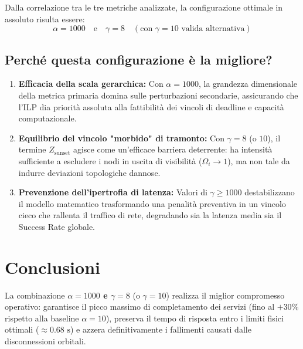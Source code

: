 \documentclass[11pt,a4paper]{article}
\begin{document}
Dalla correlazione tra le tre metriche analizzate, la configurazione ottimale in assoluto risulta essere:
\begin{equation}
    \boxed{\alpha = 1000 \quad \text{e} \quad \gamma = 8 \quad (\text{con } \gamma = 10 \text{ valida alternativa})}
\end{equation}



\subsection*{Perché questa configurazione è la migliore?}
\begin{enumerate}
    \item \textbf{Efficacia della scala gerarchica:} Con $\alpha = 1000$, la grandezza dimensionale della metrica primaria domina sulle perturbazioni secondarie, assicurando che l'ILP dia priorità assoluta alla fattibilità dei vincoli di deadline e capacità computazionale.
    \item \textbf{Equilibrio del vincolo "morbido" di tramonto:} Con $\gamma = 8$ (o $10$), il termine $Z_{\text{sunset}}$ agisce come un'efficace barriera deterrente: ha intensità sufficiente a escludere i nodi in uscita di visibilità ($\Omega_i \to 1$), ma non tale da indurre deviazioni topologiche dannose.
    \item \textbf{Prevenzione dell'ipertrofia di latenza:} Valori di $\gamma \ge 1000$ destabilizzano il modello matematico trasformando una penalità preventiva in un vincolo cieco che rallenta il traffico di rete, degradando sia la latenza media sia il Success Rate globale.
\end{enumerate}

\section{Conclusioni}
\label{sec:conclusioni}


La combinazione \textbf{$\alpha = 1000$ e $\gamma = 8$} (o \textbf{$\gamma = 10$}) realizza il miglior compromesso operativo: garantisce il picco massimo di completamento dei servizi (fino al $+30\%$ rispetto alla baseline $\alpha=10$), preserva il tempo di risposta entro i limiti fisici ottimali ($\approx 0.68\text{ s}$) e azzera definitivamente i fallimenti causati dalle disconnessioni orbitali.
\end{document}
